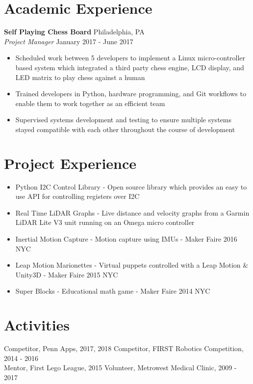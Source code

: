 \documentclass[10pt]{article}
\begin{document}
\begin{flushleft}
\section{Academic Experience}
	\textbf{Self Playing Chess Board} \hfill Philadelphia, PA \\
	\textit{Project Manager} \hfill January 2017 - June 2017 \\
	\begin{itemize}
		\item Scheduled work between 5 developers to implement a Linux 
		      micro-controller based system which integrated a third 
		      party chess engine, LCD display, and LED matrix to play 
		      chess against a human
		\item Trained developers in Python, hardware programming, and 
		      Git workflows to enable them to work together as an 
		      efficient team 
		\item Supervised systems development and testing to ensure 
		      multiple systems stayed compatible with each other 
		      throughout the course of development
	\end{itemize}

\section{Project Experience}
	\begin{itemize}
		\item Python I2C Control Library - Open source library which 
		      provides an easy to use API for controlling registers
		      over I2C
		\item Real Time LiDAR Graphs - Live distance and velocity 
		      graphs from a Garmin LiDAR Lite V3 unit running on an Omega 
		      micro controller
		\item Inertial Motion Capture - Motion capture using IMUs - 
		      Maker Faire 2016 NYC
		\item Leap Motion Marionettes - Virtual puppets controlled with 
		      a Leap Motion \& Unity3D - Maker Faire 2015 NYC
		\item Super Blocks - Educational math game - Maker Faire 2014 NYC
	\end{itemize}

\section{Activities}
	Competitor, Penn Apps, 2017, 2018 \hfill Competitor, FIRST Robotics Competition, 2014 - 2016 \\
	Mentor, First Lego League, 2015 \hfill Volunteer, Metrowest Medical Clinic, 2009 - 2017


\end{flushleft}
\end{document}
